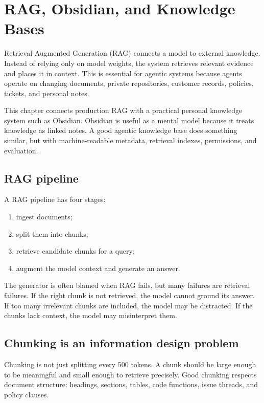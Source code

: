 \chapter{RAG, Obsidian, and Knowledge Bases}

Retrieval-Augmented Generation (RAG) connects a model to external knowledge. Instead of relying only on model weights, the system retrieves relevant evidence and places it in context. This is essential for agentic systems because agents operate on changing documents, private repositories, customer records, policies, tickets, and personal notes.

This chapter connects production RAG with a practical personal knowledge system such as Obsidian. Obsidian is useful as a mental model because it treats knowledge as linked notes. A good agentic knowledge base does something similar, but with machine-readable metadata, retrieval indexes, permissions, and evaluation.

\section{RAG pipeline}

A RAG pipeline has four stages:

\begin{enumerate}[leftmargin=*]
  \item ingest documents;
  \item split them into chunks;
  \item retrieve candidate chunks for a query;
  \item augment the model context and generate an answer.
\end{enumerate}

The generator is often blamed when RAG fails, but many failures are retrieval failures. If the right chunk is not retrieved, the model cannot ground its answer. If too many irrelevant chunks are included, the model may be distracted. If the chunks lack context, the model may misinterpret them.

\section{Chunking is an information design problem}

Chunking is not just splitting every 500 tokens. A chunk should be large enough to be meaningful and small enough to retrieve precisely. Good chunking respects document structure: headings, sections, tables, code functions, issue threads, and policy clauses.

